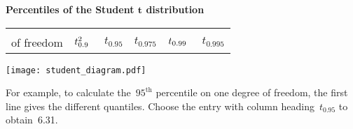 \documentclass[a4paper]{article}
\begin{document}
\begin{center}
  {\Large\bf Percentiles of the Student $\mathbf{t}$ distribution}
\end{center}


\pagestyle{empty}
\thispagestyle{empty}
\centering
\begin{tabular}{r|ccccc}
  \begin{minipage}{20mm}degrees\\of freedom\end{minipage}
  & \begin{minipage}{1.3cm}\hfill{\Large $t^2_{0.9\hphantom{9}}$}\hfill\end{minipage}
  & \begin{minipage}{1.3cm}\hfill{\Large $t_{0.95}             $}\hfill\end{minipage}
  & \begin{minipage}{1.3cm}\hfill{\Large $t_{0.975}            $}\hfill\end{minipage}
  & \begin{minipage}{1.3cm}\hfill{\Large $t_{0.99\hphantom{9}} $}\hfill\end{minipage}
  & \begin{minipage}{1.3cm}\hfill{\Large $t_{0.995}            $}\hfill\end{minipage}
  \rule[-4mm]{0mm}{10mm}
  \\  \hline

  \hline
\end{tabular}

\begin{centering}
\texttt{[image: student\_diagram.pdf]}
\end{centering}

\noindent For example, to calculate the~$95^\mathrm{th}$ percentile on
one degree of freedom, the first line gives the different quantiles.
Choose the entry with column heading~$t_{0.95}$ to obtain~6.31.


\end{document}
